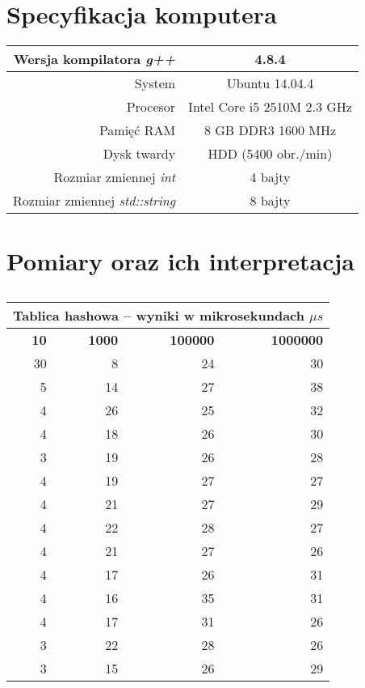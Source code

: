 \documentclass[11pt,a4paper]{article}
\begin{document}
\section{Specyfikacja komputera}

\begin{center}
	\begin{tabular}{| r | c |}
	\hline
	Wersja kompilatora \textit{g++} & 4.8.4 \\ \hline
	System & Ubuntu 14.04.4 \\ \hline
	Procesor	 & Intel Core i5 2510M 2.3 GHz \\ \hline
	Pamięć RAM & 8 GB DDR3 1600 MHz \\ \hline
	Dysk twardy & HDD (5400 obr./min) \\ \hline
	Rozmiar zmiennej \textit{int} & 4 bajty \\ \hline
	Rozmiar zmiennej \textit{std::string} & 8 bajty \\ \hline	
	\end{tabular}
\end{center}

\section{Pomiary oraz ich interpretacja}

\begin{table}[htbp]
\caption{}
\begin{center}
\begin{tabular}{|r|r|r|r|}
\hline
\multicolumn{ 4}{|c|}{\textbf{Tablica hashowa – wyniki w mikrosekundach $\mu s$}} \\ \hline
\textbf{10} & \textbf{1000} & \textbf{100000} & \textbf{1000000} \\ \hline
30 & 8 & 24 & 30 \\ \hline
5 & 14 & 27 & 38 \\ \hline
4 & 26 & 25 & 32 \\ \hline
4 & 18 & 26 & 30 \\ \hline
3 & 19 & 26 & 28 \\ \hline
4 & 19 & 27 & 27 \\ \hline
4 & 21 & 27 & 29 \\ \hline
4 & 22 & 28 & 27 \\ \hline
4 & 21 & 27 & 26 \\ \hline
4 & 17 & 26 & 31 \\ \hline
4 & 16 & 35 & 31 \\ \hline
4 & 17 & 31 & 26 \\ \hline
3 & 22 & 28 & 26 \\ \hline
3 & 15 & 26 & 29 \\ \hline
\end{tabular}
\end{center}
\label{Wyniki pomiarów1}
\end{table}
\end{document}
